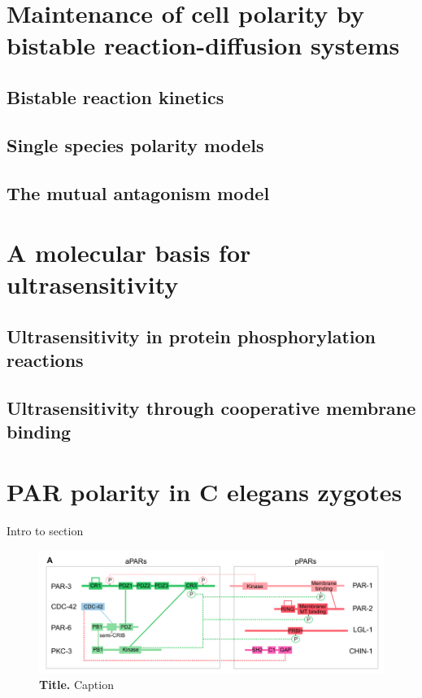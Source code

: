 \documentclass[12pt]{"report"}
\newcommand{\mycaption}[2]{\caption[#1]{\textbf{#1.} #2}}
\begin{document}
\clearpage
\section{Maintenance of cell polarity by bistable reaction-diffusion systems}
\subsection{Bistable reaction kinetics}
\subsection{Single species polarity models}
\subsection{The mutual antagonism model}

\clearpage
\section{A molecular basis for ultrasensitivity}
\subsection{Ultrasensitivity in protein phosphorylation reactions}
\subsection{Ultrasensitivity through cooperative membrane binding}

\clearpage
\section{PAR polarity in C elegans zygotes}

Intro to section

\begin{figure}[!h]
\includegraphics[scale=0.9]{par_proteins_schematic}
\setlength{\abovecaptionskip}{20pt}
\centering
\mycaption{Title}{Caption}
\label{fig:par_proteins_schematic}
\end{figure}
\end{document}
